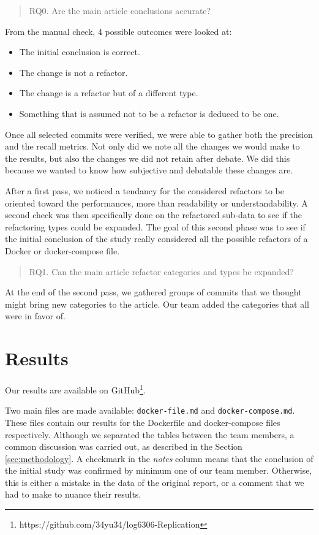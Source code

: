 \documentclass[lettersize,journal]{IEEEtran}
\begin{document}
\begin{quote}
        RQ0. Are the main article conclusions accurate?
\end{quote}
From the manual check, 4 possible outcomes were looked at:
\begin{itemize}
        \item The initial conclusion is correct.
        \item The change is not a refactor.
        \item The change is a refactor but of a different type.
        \item Something that is assumed not to be a refactor is deduced to be one.
\end{itemize}
Once all selected commits were verified, we were able to gather both the precision and the recall metrics.
Not only did we note all the changes we would make to the results, but also the changes we did not retain after debate.
We did this because we wanted to know how subjective and debatable these changes are.

After a first pass, we noticed a tendancy for the considered refactors to be oriented toward the performances, more than readability or understandability.
A second check was then specifically done on the refactored sub-data to see if the refactoring types could be expanded.
The goal of this second phase was to see if the initial conclusion of the study really considered all the possible refactors of a Docker or docker-compose file.

\begin{quote}
        RQ1. Can the main article refactor categories and types be expanded?
\end{quote}
At the end of the second pass, we gathered groups of commits that we thought might bring new categories to the article.
Our team added the categories that all were in favor of.

\section{Results}

Our results are available on GitHub\footnote{https://github.com/34yu34/log6306-Replication}.

Two main files are made available: \texttt{docker-file.md} and \texttt{docker-compose.md}. These files contain our results for the Dockerfile and docker-compose files respectively.
Although we separated the tables between the team members, a common discussion was carried out, as described in the Section \ref{sec:methodology}.
A checkmark in the \textit{notes} column means that the conclusion of the initial study was confirmed by minimum one of our team member.
Otherwise, this is either a mistake in the data of the original report, or a comment that we had to make to nuance their results.
\end{document}
